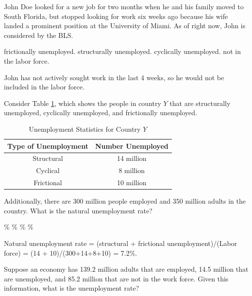 \documentclass[addpoints,11pt]{exam}
\theoremstyle{definition}
\begin{document}
\begin{questions}
	\question John Doe looked for a new job for two months when he and his family moved to South Florida, but stopped looking for work six weeks ago because his wife landed a prominent position at the University of Miami. As of right now, John is considered \underline{\hspace{3cm}} by the BLS.
	\begin{choices}
		\choice frictionally unemployed.
		\choice structurally unemployed. 
		\choice cyclically unemployed.
		\CorrectChoice not in the labor force.
	\end{choices}

	\begin{solution}
		John has not actively sought work in the last 4 weeks, so he would not be included in the labor force.
	\end{solution}

	\question Consider Table \ref{MC28}, which shows the people in country $Y$ that are structurally unemployed, cyclically unemployed, and frictionally unemployed. 
	
	
	\begin{table}[H]
		\caption{Unemployment Statistics for Country $Y$}
		\centering
		\begin{tabular}{  c | c} 
			
			Type of Unemployment & Number Unemployed\\
			\hline
			Structural &  14 million\\
			Cyclical &  8 million\\
			Frictional & 10 million\\
		\end{tabular}
		\label{MC28}
	\end{table}
	
	
	
	Additionally, there are 300 million people employed and 350 million adults in the country. What is the natural unemployment rate?
	
	\begin{choices}
		\CorrectChoice 7.2\%
		\choice 8.0\%
		\choice 9.1\%
		\choice 9.6\%
	\end{choices}
	
	\begin{solution}
		Natural unemployment rate = (structural + frictional unemployment)/(Labor force) = (14 + 10)/(300+14+8+10) = 7.2\%.
	\end{solution}
	
	\question Suppose an economy has 139.2 million adults that are employed, 14.5 million that are unemployed, and 85.2 million that are not in the work force. Given this information, what is the unemployment rate?
	

\end{questions}
\end{document}

